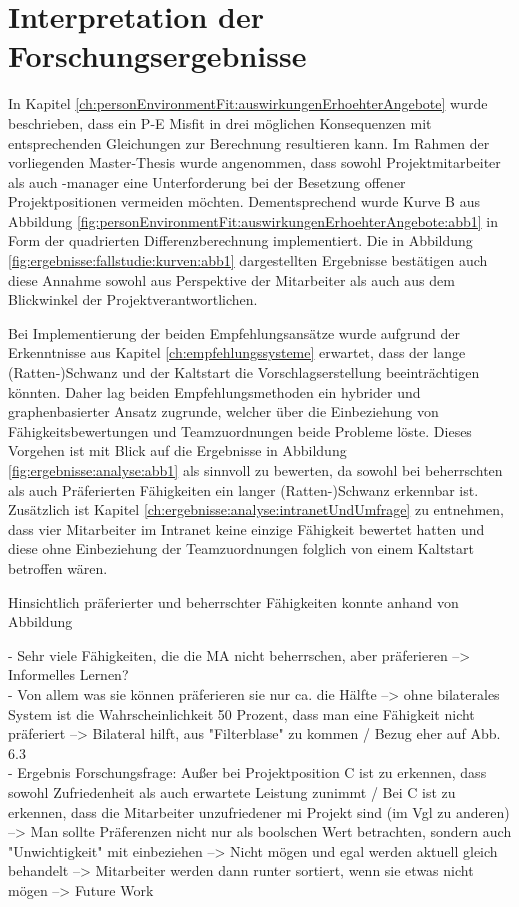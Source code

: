 \section{Interpretation der Forschungsergebnisse}
\label{ch:diskussion:interpretation}
In Kapitel \ref{ch:personEnvironmentFit:auswirkungenErhoehterAngebote} wurde beschrieben, dass ein P-E Misfit in drei möglichen Konsequenzen mit entsprechenden Gleichungen zur Berechnung resultieren kann. Im Rahmen der vorliegenden Master-Thesis wurde angenommen, dass sowohl Projektmitarbeiter als auch -manager eine Unterforderung bei der Besetzung offener Projektpositionen vermeiden möchten. Dementsprechend wurde Kurve B aus Abbildung \ref{fig:personEnvironmentFit:auswirkungenErhoehterAngebote:abb1} in Form der quadrierten Differenzberechnung implementiert. Die in Abbildung \ref{fig:ergebnisse:fallstudie:kurven:abb1} dargestellten Ergebnisse bestätigen auch diese Annahme sowohl aus Perspektive der Mitarbeiter als auch aus dem Blickwinkel der Projektverantwortlichen. 

Bei Implementierung der beiden Empfehlungsansätze wurde aufgrund der Erkenntnisse aus Kapitel \ref{ch:empfehlungssysteme} erwartet, dass der lange (Ratten-)Schwanz und der Kaltstart die Vorschlagserstellung beeinträchtigen könnten. Daher lag beiden Empfehlungsmethoden ein hybrider und graphenbasierter Ansatz zugrunde, welcher über die Einbeziehung von Fähigkeitsbewertungen und Teamzuordnungen beide Probleme löste. Dieses Vorgehen ist mit Blick auf die Ergebnisse in Abbildung \ref{fig:ergebnisse:analyse:abb1} als sinnvoll zu bewerten, da sowohl bei beherrschten als auch Präferierten Fähigkeiten ein langer (Ratten-)Schwanz erkennbar ist. Zusätzlich ist Kapitel \ref{ch:ergebnisse:analyse:intranetUndUmfrage} zu entnehmen, dass vier Mitarbeiter im Intranet keine einzige Fähigkeit bewertet hatten und diese ohne Einbeziehung der Teamzuordnungen folglich von einem Kaltstart betroffen wären.

Hinsichtlich präferierter und beherrschter Fähigkeiten konnte anhand von Abbildung 


\newpage
- Sehr viele Fähigkeiten, die die MA nicht beherrschen, aber präferieren --> Informelles Lernen?\\
- Von allem was sie können präferieren sie nur ca. die Hälfte --> ohne bilaterales System ist die Wahrscheinlichkeit 50 Prozent, dass man eine Fähigkeit nicht präferiert --> Bilateral hilft, aus "Filterblase" zu kommen / Bezug eher auf Abb. 6.3\\
- Ergebnis Forschungsfrage: Außer bei Projektposition C ist zu erkennen, dass sowohl Zufriedenheit als auch erwartete Leistung zunimmt / Bei C ist zu erkennen, dass die Mitarbeiter unzufriedener mi Projekt sind (im Vgl zu anderen) --> Man sollte Präferenzen nicht nur als boolschen Wert betrachten, sondern auch "Unwichtigkeit" mit einbeziehen --> Nicht mögen und egal werden aktuell gleich behandelt --> Mitarbeiter werden dann runter sortiert, wenn sie etwas nicht mögen --> Future Work

